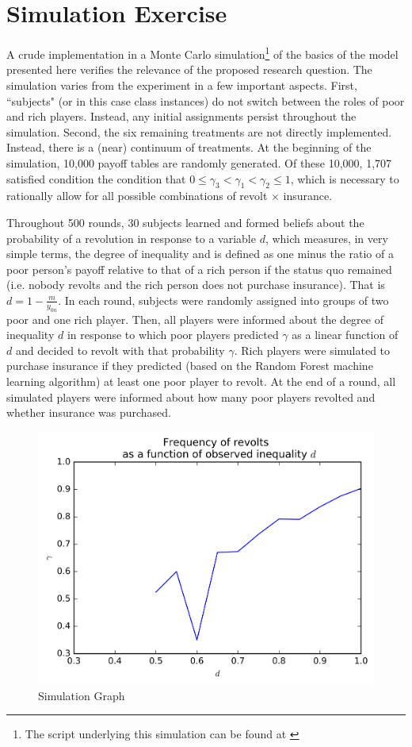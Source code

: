 \documentclass[12pt]{article}
\begin{document}
	\section{Simulation Exercise}
	A crude implementation in a Monte Carlo simulation\footnote{The script 
	underlying this simulation can be found at \url{}} of the basics of the 
	model presented here verifies the relevance of the proposed research 
	question. The simulation varies from the experiment in a few important 
	aspects. First, ``subjects" (or in this case class instances) do not switch 
	between the roles of poor and rich players. Instead, any initial 
	assignments persist throughout the simulation. Second, the six remaining 
	treatments are not directly implemented. Instead, there is a (near) 
	continuum of treatments. At the beginning of the simulation, 10,000 payoff 
	tables are randomly generated. Of these 10,000, 1,707 satisfied condition 
	the condition that $0 \leq \gamma_3 < \gamma_1 < \gamma_2 \leq 1$, which is 
	necessary to rationally allow for all possible combinations of revolt 
	$\times$ insurance.
	
	Throughout 500 rounds, 30 subjects learned and formed beliefs about the 
	probability of a revolution in response to a variable $d$, which measures, 
	in very simple terms, the degree of inequality and is defined as one minus 
	the ratio of a poor person's payoff relative to that of a rich person if 
	the status quo remained (i.e. nobody revolts and the rich person does not 
	purchase insurance). That is $d=1-\frac{m}{y_{0n}}$. In each round, 
	subjects were randomly assigned into groups of two poor and one rich 
	player. Then, all players were informed about the degree of inequality $d$ 
	in response to which poor players predicted $\gamma$ as a linear function 
	of $d$ and decided to revolt with that probability $\gamma$. Rich players 
	were simulated to purchase insurance if they predicted (based on the Random 
	Forest machine learning algorithm) at least one poor player to revolt. At 
	the end of a round, all simulated players were informed about how many poor 
	players revolted and whether insurance was purchased.
	
	\begin{figure}[!htbp]
		\caption{Simulation Graph}
		\label{simgraph}
		\centering
		\includegraphics[width=.5\textwidth]{../graph.png}
	\end{figure}
	
\end{document}
